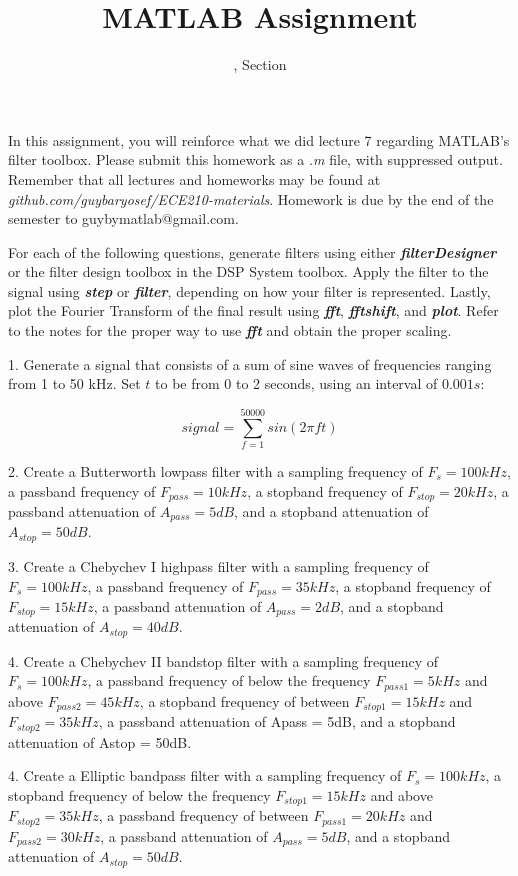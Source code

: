 \documentclass[11pt]{article}
\title{MATLAB Assignment \Homework}
\author{\Session, Section \Section}
\date{}
\makeatletter
\def\MyEmail{guybymatlab@gmail.com}
\makeatother
\begin{document}
\maketitle
In this assignment, you will reinforce what we did lecture 7
regarding MATLAB's filter toolbox.
Please submit this homework as a \textit{.m} file, 
with suppressed output.
Remember that all lectures and homeworks may be found at 
\textit{github.com/guybaryosef/ECE210-materials}.
Homework is due by the end of the semester to \MyEmail.

For each of the following questions,
generate filters using either \textbf{\textit{filterDesigner}}
 or the filter design toolbox in the DSP System toolbox.
Apply the filter to the signal using \textit{\textbf{step}} or \textit{\textbf{filter}},
depending on how your filter is represented.
Lastly, plot the Fourier Transform of the final result using \textit{\textbf{fft}}, \textit{\textbf{fftshift}},  
and \textit{\textbf{plot}}.
Refer to the notes for the proper way to use \textit{\textbf{fft}} and obtain the proper scaling.

1. Generate a signal that consists of a sum of sine waves of frequencies ranging from 1 to 50 kHz.
Set $t$ to be from 0 to 2 seconds, using an interval of $0.001s$:

$$ signal = \sum_{f=1}^{50000} sin(2\pi ft)$$

2. Create a Butterworth lowpass filter with a sampling frequency of $F_s = 100 kHz$,
a passband frequency of $F_{pass} = 10 kHz$, a stopband frequency of $F_{stop} = 20 kHz$,
a passband attenuation of $A_{pass} = 5dB$, and a stopband attenuation of $A_{stop} = 50dB$.

3. Create a Chebychev I highpass filter with a sampling frequency of $F_s = 100 kHz$,
a passband frequency of $F_{pass} = 35 kHz$, a stopband frequency of $F_{stop} = 15 kHz$,
a passband attenuation of $A_{pass} = 2dB$, and a stopband attenuation of $A_{stop} = 40dB$.

4. Create a Chebychev II bandstop filter with a sampling frequency of $F_s = 100 kHz$,
a passband frequency of below the frequency $F_{pass1} = 5 kHz$ and above $F_{pass2} = 45 kHz$,
a stopband frequency of between $F_{stop1} = 15 kHz$ and $F_{stop2} = 35kHz$,
a passband attenuation of Apass = 5dB, and a stopband attenuation of Astop = 50dB.

4. Create a Elliptic bandpass filter with a sampling frequency of $F_s = 100 kHz$,
a stopband frequency of below the frequency $F_{stop1} = 15 kHz$ and above $F_{stop2} = 35 kHz$,
a passband frequency of between $F_{pass1} = 20 kHz$ and $F_{pass2} = 30 kHz$,
a passband attenuation of $A_{pass} = 5dB$, and a stopband attenuation of $A_{stop} = 50dB$.
\end{document}
